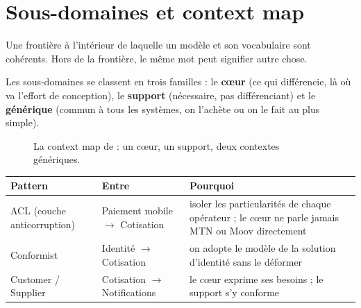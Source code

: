 \section{Sous-domaines et context map}
\begin{concept}
Une frontière à l'intérieur de laquelle un modèle et son vocabulaire sont cohérents. Hors de la
frontière, le même mot peut signifier autre chose.
\end{concept}
Les sous-domaines se classent en trois familles : le \textbf{cœur} (ce qui différencie, là où va l'effort de
conception), le \textbf{support} (nécessaire, pas différenciant) et le \textbf{générique} (commun à tous les systèmes, on
l'achète ou on le fait au plus simple).

\begin{figure}[H]
\centering
{}
\caption{La context map de \sika{} : un cœur, un support, deux contextes génériques.}
\end{figure}

\noindent\begin{tabularx}{\linewidth}{>{\raggedright\arraybackslash}p{3.4cm}>{\raggedright\arraybackslash}p{3.8cm}X}
\toprule
\textbf{Pattern} & \textbf{Entre} & \textbf{Pourquoi} \\ \midrule
ACL (couche anticorruption) & Paiement mobile $\to$ Cotisation & isoler les particularités de chaque opérateur ; le cœur ne parle jamais MTN ou Moov directement \\
Conformist & Identité $\to$ Cotisation & on adopte le modèle de la solution d'identité sans le déformer \\
Customer / Supplier & Cotisation $\to$ Notifications & le cœur exprime ses besoins ; le support s'y conforme \\
\bottomrule
\end{tabularx}

